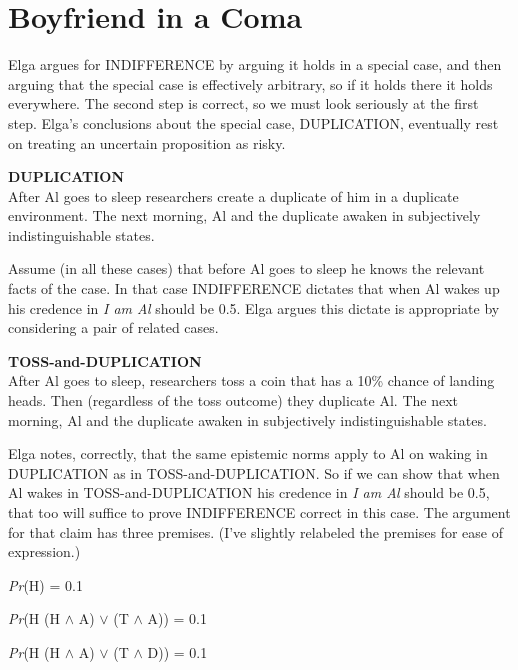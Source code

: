 \documentclass[
  11pt,
  letterpaper,
  DIV=11,
  numbers=noendperiod,
  oneside]{scrartcl}
\providecommand{\tightlist}{%
  \setlength{\itemsep}{0pt}\setlength{\parskip}{0pt}}\usepackage{longtable,booktabs,array}
\begin{document}
\section{Boyfriend in a Coma}\label{boyfriend-in-a-coma}

Elga argues for INDIFFERENCE by arguing it holds in a special case, and
then arguing that the special case is effectively arbitrary, so if it
holds there it holds everywhere. The second step is correct, so we must
look seriously at the first step. Elga's conclusions about the special
case, DUPLICATION, eventually rest on treating an uncertain proposition
as risky.

\textbf{DUPLICATION}\\
After Al goes to sleep researchers create a duplicate of him in a
duplicate environment. The next morning, Al and the duplicate awaken in
subjectively indistinguishable states.

Assume (in all these cases) that before Al goes to sleep he knows the
relevant facts of the case. In that case INDIFFERENCE dictates that when Al wakes up his credence in \emph{I
am Al} should be 0.5. Elga argues this dictate is appropriate by
considering a pair of related cases.

\textbf{TOSS-and-DUPLICATION}\\
After Al goes to sleep, researchers toss a coin that has a 10\% chance
of landing heads. Then (regardless of the toss outcome) they duplicate
Al. The next morning, Al and the duplicate awaken in subjectively
indistinguishable states.

Elga notes, correctly, that the same epistemic norms apply to Al on
waking in DUPLICATION as in TOSS-and-DUPLICATION. So if we can show that
when Al wakes in TOSS-and-DUPLICATION his credence in \emph{I am Al}
should be 0.5, that too will suffice to prove INDIFFERENCE correct in
this case. The argument for that claim has three premises. (I've
slightly relabeled the premises for ease of expression.)

\begin{description}
\tightlist
\item[(1)]
\emph{Pr}(H) = 0.1
\item[(2)]
\emph{Pr}(H (H \({\wedge}\) A) \({\vee}\) (T \({\wedge}\) A)) = 0.1
\item[(3)]
\emph{Pr}(H (H \({\wedge}\) A) \({\vee}\) (T \({\wedge}\) D)) = 0.1
\end{description}
\end{document}
